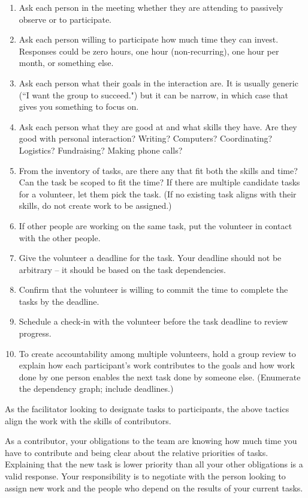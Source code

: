 \begin{enumerate}
    \item Ask each person in the meeting whether they are attending to passively observe or to participate.
    \item Ask each person willing to participate how much time they can invest. Responses could be zero hours, one hour (non-recurring), one hour per month, or something else.
    \item Ask each person what their goals in the interaction are. It is usually generic (``I want the group to succeed.") but it can be narrow, in which case that gives you something to focus on.
    \item Ask each person what they are good at and what skills they have. Are they good with personal interaction? Writing? Computers? Coordinating? Logistics? Fundraising? Making phone calls?
    \item From the inventory of tasks, are there any that fit both the skills and time? Can the task be scoped to fit the time? If there are multiple candidate tasks for a volunteer, let them pick the task. (If no existing task aligns with their skills, do not create work to be assigned.)
    \item If other people are working on the same task, put the volunteer in contact with the other people.
    \item Give the volunteer a deadline for the task. Your deadline should not be arbitrary -- it should be based on the task dependencies. 
    \item Confirm that the volunteer is willing to commit the time to complete the tasks by the deadline.
    \item Schedule a check-in with the volunteer before the task deadline to review progress.
    \item To create accountability among multiple volunteers, hold a group review to explain how each participant's work contributes to the goals and how work done by one person enables the next task done by someone else. (Enumerate the dependency graph; include deadlines.)
\end{enumerate}

As the facilitator looking to designate tasks to participants, the above tactics align the work with the skills of contributors. 

As a contributor, your obligations to the team are knowing how much time you have to contribute and being clear about the relative priorities of tasks. Explaining that the new task is lower priority than all your other obligations is a valid response. Your responsibility is to negotiate with the person looking to assign new work and the people who depend on the results of your current tasks. 
